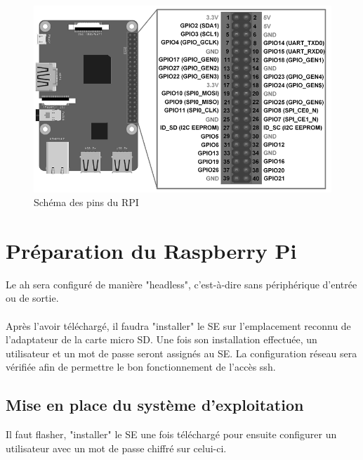 \documentclass[a4paper]{article}
\begin{document}
\label{sec:fig5}
\begin{figure}[!ht]
    \centering
    \includegraphics[scale=0.5]{gpio_pins_grayscale.png}
    \caption{Schéma des pins du RPI}
\end{figure}
\newpage
\section{Préparation du Raspberry Pi}
Le \acrshort{ah} sera configuré de manière "headless", c'est-à-dire sans périphérique d'entrée ou de sortie.\\\\Après l'avoir téléchargé, il faudra "installer" le SE sur l'emplacement reconnu de l'adaptateur de la carte micro SD. Une fois son installation effectuée, un utilisateur et un mot de passe seront assignés au SE. La configuration réseau sera vérifiée afin de permettre le bon fonctionnement de l'accès \gls{ssh}.
\subsection{Mise en place du système d'exploitation}
Il faut flasher, "installer" le SE une fois téléchargé pour ensuite configurer un utilisateur avec un mot de passe chiffré sur celui-ci.
\end{document}
